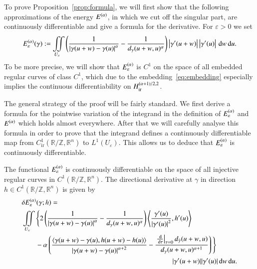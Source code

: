 To prove Proposition~\ref{prop:formula}, we will first show that the following approximations
of the energy $E^{(\alpha)}$, in which we cut off the singular part, are continuously differentiable 
and give a formula for the derivative.
For $\varepsilon >0$ we set
\begin{equation*}
  E_{\varepsilon}^{(\alpha)}(\gamma) := \iint\limits_{ U_{\varepsilon}} 
    \left(\frac1{\left|{\gamma}(u+w)-{\gamma}(u)\right|^{\alpha}}-\frac1{d_\gamma(u+w,u)^{\alpha}}\right)\left|{\gamma}'(u+w)\right|\left|{\gamma}'(u)\right|
    \,\mathrm{d} w\,\mathrm{d} u.  
\end{equation*}
To be more precise, we will show that $E_{\varepsilon}^{(\alpha)}$ is $C^1$ on the space of all embedded 
regular curves of class $C^1$, which due to the embedding~\eqref{eq:embedding} 
especially implies the continuous differentiability on $H_{\mathrm{ir}}^{(\alpha+1)/2,2}$.

The general strategy of the proof will be fairly standard. We first derive
a formula for the pointwise variation of the integrand in the definition of $E_{\varepsilon}^{(\alpha)}$
and $E^{(\alpha)}$ which holds almost everywhere. After that we will carefully analyse this formula
in order to prove that the integrand defines a continuously differentiable map
from $C_{\mathrm{ir}}^{1}(\mathbb R / \mathbb Z, \mathbb R^n)$ to $L^1 (U_{\varepsilon})$.
This allows us to deduce that $E_{\varepsilon}^{(\alpha)}$ is continuously differentiable.

\begin{lemma} \label{lem:FrechetDifferentiable}
The functional $E_{\varepsilon}^{(\alpha)}$ is continuously differentiable on the space
of all injective regular curves in $C^1(\mathbb R / \mathbb Z,\mathbb R^n)$.
The directional derivative
at $\gamma $ in direction $h\in C^1(\mathbb R / \mathbb Z, \mathbb R^n)$ is given by
\begin{equation}\label{eq:FrechetDifferentiable}
\begin{split}
    &\delta\Ee(\g;h)  = \\
    & \iint\limits_{U_\eps} \Bigg\{
    2\left(
      \frac 1 {\abs{\D\g}^\a}-\frac 1 {d_\g(u+w,u)^\a} \right)
      \left\langle \frac{\dg(u)}{\abs{\dg(u)}^2},\dh(u) \right\rangle 
\\
    &\qquad -\a %
      \left( \frac{\sp{\D\g,\D h}}{\abs{\D\g}^{\a+2}}
	-\frac{ \left.\tfrac{\d}{\d\tau}\right|_{\tau=0}d_{\gt}(u+w,u)}
		{d_\g(u+w,u)^{\a+1}} \right)\Bigg\} 
\\ &\hspace{7.6cm} |\dg(u+w)| |\dg(u)|\d w\d u .
  \end{split}
\end{equation}
\end{lemma}

